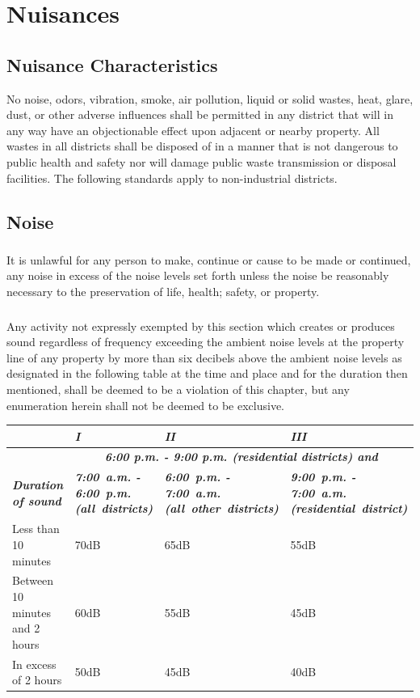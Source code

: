 \section{Nuisances}
\subsection{Nuisance Characteristics}
No noise, odors, vibration, smoke, air pollution, liquid or solid wastes, heat, glare, dust, or other adverse influences shall be permitted in any district that will in any way have an objectionable effect upon adjacent or nearby property. All wastes in all districts shall be disposed of in a manner that is not dangerous to public health and safety nor will damage public waste transmission or disposal facilities. The following standards apply to non-industrial districts.
\subsection{Noise}
\subsubsection{}
It is unlawful for any person to make, continue or cause to be made or continued, any noise in excess of the noise levels set forth unless the noise be reasonably necessary to the preservation of life, health; safety, or property.
\subsubsection{}
Any activity not expressly exempted by this section which creates or produces sound regardless of frequency exceeding the ambient noise levels at the property line of any property by more than six decibels above the ambient noise levels as designated in the following table at the time and place and for the duration then mentioned, shall be deemed to be a violation of this chapter, but any enumeration herein shall not be deemed to be exclusive.\\
\begin{center}
\begin{tabular}{|p{3.5cm}|p{3.5cm}|p{3.5cm}|p{3.5cm}|}
    \hline
    \multirow{2}{*}{~} & \emph{\textbf{I}} & \emph{\textbf{II}} & \emph{\textbf{III}}\\
    \hline
    & \multicolumn{3}{|c|}{\emph{\textbf{6:00 p.m. - 9:00 p.m. (residential districts) and}}}\\
    \hline
    \emph{\textbf{Duration of sound}} & \emph{\textbf{\mbox{7:00 a.m.} - \mbox{6:00 p.m.} \mbox{(all districts)}}} & \emph{\textbf{\mbox{6:00 p.m.} - \mbox{7:00 a.m.} \mbox{(all other districts)}}} & \emph{\textbf{\mbox{9:00 p.m.} - \mbox{7:00 a.m.} \mbox{(residential district)}}}\\
    \hline
    Less than 10 minutes & 70dB & 65dB & 55dB\\
    \hline
    Between 10 minutes and 2 hours & 60dB & 55dB & 45dB\\
    \hline
    In excess of 2 hours & 50dB & 45dB & 40dB\\
    \hline
\end{tabular}
\end{center}
